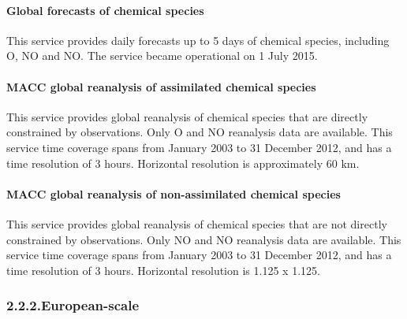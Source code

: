 \documentclass[9pt]{report}
\begin{document}
\paragraph{Global forecasts of chemical species}\label{sec-global-forecasts-of-chemical-species}%

\noindent{}This service provides daily forecasts up to 5 days of chemical species, including O, NO and NO. 
The service became operational on 1 July 2015.%

\paragraph{MACC global reanalysis of assimilated chemical species}\label{sec-macc-global-reanalysis-of-assimilated-chemical-species}%

\noindent{}This service provides global reanalysis of chemical species that are directly constrained by observations.
Only O and NO reanalysis data are available. 
This service time coverage spans from January 2003 to 31 December 2012, and has a time resolution of 3 hours.
Horizontal resolution is approximately 60 km.%

\paragraph{MACC global reanalysis of non-assimilated chemical species}\label{sec-macc-global-reanalysis-of-non-assimilated-chemical-species}%

\noindent{}This service provides global reanalysis of chemical species that are not directly constrained by observations. 
Only NO and NO reanalysis data are available. 
This service time coverage spans from January 2003 to 31 December 2012, and has a time resolution of 3 hours.
Horizontal resolution is 1.125\textdegree{} x 1.125\textdegree{}.%

\subsubsection{2.2.2.\hspace*{0.5em}European-scale}\label{sec-european-scale}%
\end{document}
